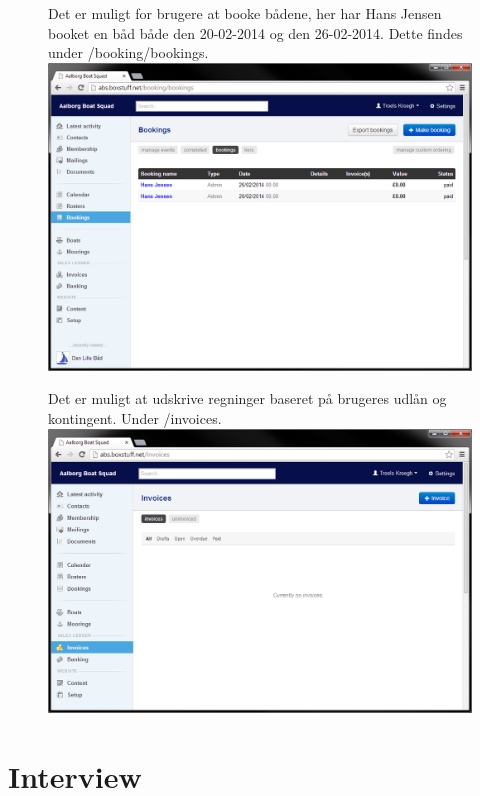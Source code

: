 \begin{figure}
	Det er muligt for brugere at booke bådene, her har Hans Jensen booket en båd både den 20-02-2014 og den 26-02-2014. Dette findes under /booking/bookings.\newline
	\includegraphics[scale=0.5]{images/teknologi/_Bookings}
\end{figure}

\begin{figure}
	Det er muligt at udskrive regninger baseret på brugeres udlån og kontingent. Under /invoices.\newline
	\includegraphics[scale=0.5]{images/teknologi/_Invoices}
\end{figure}

\chapter{Interview}\label{interview}
